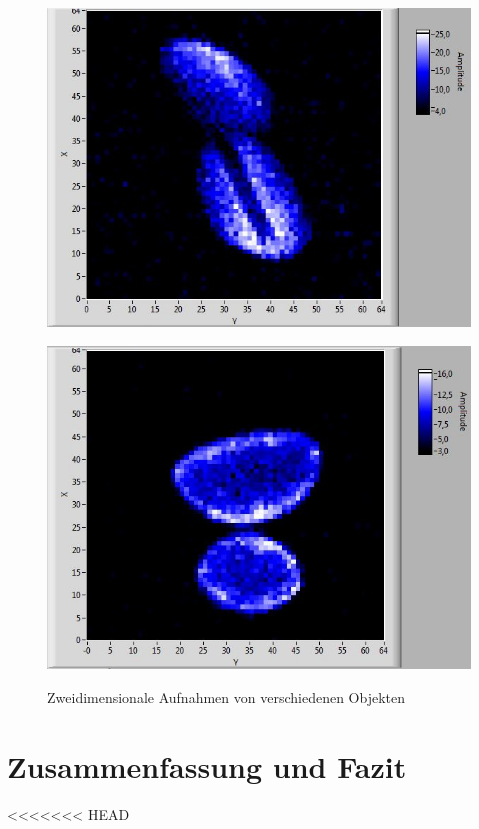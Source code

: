 \documentclass[a4paper]{scrartcl} %
\begin{document}
\begin{figure}[htbp]
{	\parbox{0.48\textwidth}{
		\centering
		\includegraphics[width=1.0 \linewidth]{./Resources/Teil_3/peanut_shell.JPG}
		\label{fig:2d_erdnuss}}
	\hfill  
	\parbox{0.48\textwidth}{
		\centering
		\includegraphics[width=1.0 \linewidth]{./Resources/Teil_3/aloevera_2d.JPG}
		\label{fig:2d_aloevera}}
		
		}	
		\caption{Zweidimensionale Aufnahmen von verschiedenen Objekten}
		\label{fig:2d_main}
	
\end{figure}


\section{Zusammenfassung und Fazit}

<<<<<<< HEAD
\end{document}
